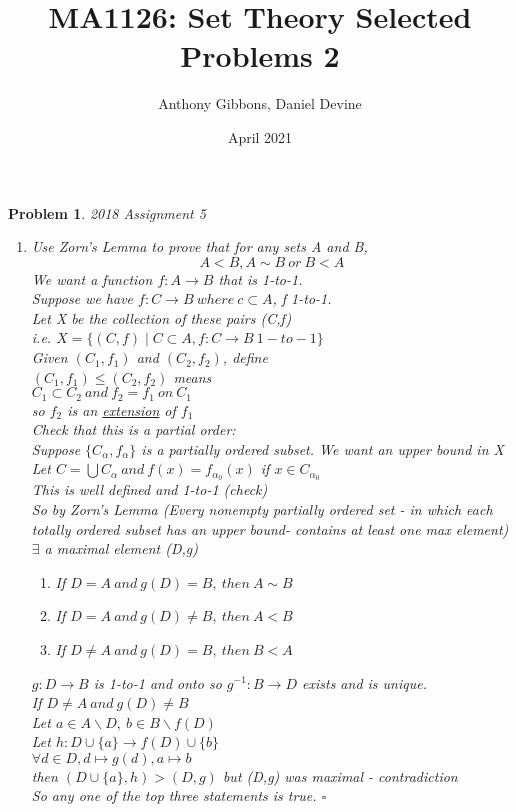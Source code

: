 \documentclass[a4paper]{article}
\title{MA1126: Set Theory
 Selected Problems 2}
\author{Anthony Gibbons, Daniel Devine}
\date{April 2021}
\newtheorem{prob}{\large{\large{Problem}}}
\newenvironment{sol}{\noindent{\large{\bf Solution:}}}{\hfill\ensuremath{\square}}
\def\bs{\backslash}
\begin{document}
\maketitle

\begin{prob} %
\large{ 2018 Assignment 5
\begin{enumerate}
    \item Use Zorn's Lemma to prove that for any sets A and B, 
    $$A<B, A\sim B \ or \ B<A$$
    \begin{sol}
    We want a function $f:A\to B$ that is 1-to-1. \\
    Suppose we have $f:C\to B \ where\  c\subset A$, f 1-to-1.\\
    Let X be the collection of these pairs (C,f)\\
    i.e. $X=\{(C,f)\;|\; C\subset A, f:C\to B \ 1-to-1\}$\\
    Given $(C_1,f_1)$ and $(C_2,f_2)$, define\\
    $(C_1,f_1) \leq (C_2,f_2)$ means\\
    $C_1\subset C_2 \ and \ f_2=f_1 \ on \ C_1$\\
    so $f_2$ is an \underline{extension} of $f_1$\\
    Check that this is a partial order:\\
    Suppose $\{C_\alpha,f_\alpha\}$ is a partially ordered subset. We want an upper bound in X\\
    Let $C=\bigcup C_\alpha \ and \ f(x)=f_{\alpha_0}(x)$ if $x\in C_{\alpha_0}$\\
    This is well defined and 1-to-1 (check)\\
    So by Zorn's Lemma (Every nonempty partially ordered set - in which each totally ordered subset has an upper bound- contains at least one max element) $\exists$ a maximal element (D,g)
    \begin{enumerate}[(1)]
        \item  If $D=A \ and \ g(D)=B, \ then \ A\sim B$
        \item  If $D=A \ and \ g(D)\neq B, \ then \ A<B$
        \item  If $D\neq A\  and\  g(D)=B,\  then \ B<A$
    \end{enumerate}
    $g:D\to B$ is 1-to-1 and onto so $g^{-1}:B\to D$ exists and is unique.\\
    If $D\neq A \ and\  g(D)\neq B$\\ 
    Let $a\in A\bs D,\  b\in B\bs f(D)$\\
    Let $h:D\cup \{a\}\to f(D)\cup \{b\}$\\
    $\forall d\in D, d\mapsto g(d), a\mapsto b$\\
    then $(D\cup \{a\}, h)>(D,g)$ but (D,g) was maximal - contradiction\\
    So any one of the top three statements is true.
    \end{sol}
\end{enumerate}
}
\end{prob}
\end{document}
